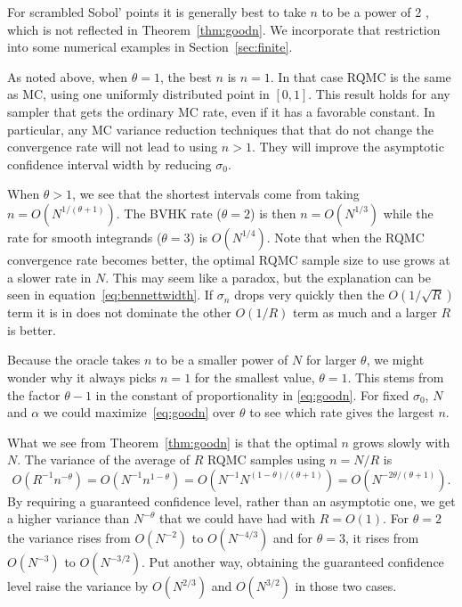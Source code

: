 \documentclass{article}
\newcommand{\fred}[1]{\begingroup\color{red}#1\endgroup}
\begin{document}
For scrambled Sobol' points it is generally best to
take $n$ to be a power of 2 \cite{Owe22a}, which is not
reflected in Theorem~\ref{thm:goodn}. We incorporate that restriction
into some numerical examples in Section~\ref{sec:finite}.

As noted above, when $\theta = 1$, the best $n$ is $n=1$. In that case RQMC is the same as MC, using one uniformly distributed point in $[0,1]$. This result holds for any sampler that gets the ordinary MC rate, even if it has a favorable constant.  In particular, any MC variance reduction techniques that that do not change the convergence rate will not lead to using $n>1$.  They will improve the asymptotic confidence interval width by reducing $\sigma_0$.  

When $\theta>1$, we see that the shortest intervals
come from taking $n = O(N^{1/(\theta+1)})$.
The BVHK rate ($\theta=2$) is then $n=O(N^{1/3})$ while the
rate for smooth integrands ($\theta=3$) is $O(N^{1/4})$.
Note that when the RQMC convergence rate becomes better,
the optimal RQMC sample size to use grows at a slower
rate in $N$.  This may seem like a paradox, but the explanation
can be seen in equation~\eqref{eq:bennettwidth}.
If $\sigma_n$ drops very quickly then the $O(1/\sqrt{R})$ term
it is in does not dominate the other $O(1/R)$ term as much
and a larger $R$ is better.

Because the oracle takes $n$ to be a smaller
power of $N$ for larger $\theta$, we might
wonder why it always picks $n=1$ for the smallest value, $\theta=1$. 
This stems from the factor $\theta-1$ in the constant of proportionality
in \eqref{eq:goodn}.
For fixed $\sigma_0$, $N$ and $\alpha$ we could 
maximize~\eqref{eq:goodn} over $\theta$
to see which rate gives the largest $n$.

What we see from Theorem~\ref{thm:goodn} is that the optimal
$n$ grows slowly with $N$. The variance of the average of $R$
RQMC samples using $n=N/R$ is
$$
O(R^{-1}n^{-\theta}) = O( N^{-1}n^{1-\theta})
= O( N^{-1}N^{(1-\theta)/(\theta+1)})
= O( N^{-2\theta/(\theta+1)}).
$$
By requiring a guaranteed confidence level\fred{, rather than an asymptotic one}, we
get a higher variance than $N^{-\theta}$
that we could have had with $R=O(1)$.
For $\theta=2$ the variance rises
from $O(N^{-2})$ to $O(N^{-4/3})$
and for $\theta=3$, it rises from
$O(N^{-3})$ to $O(N^{-3/2})$.
Put another way, obtaining the guaranteed confidence
level raise the variance by $O(N^{2/3})$
and $O(N^{3/2})$ in those two cases.
\end{document}
